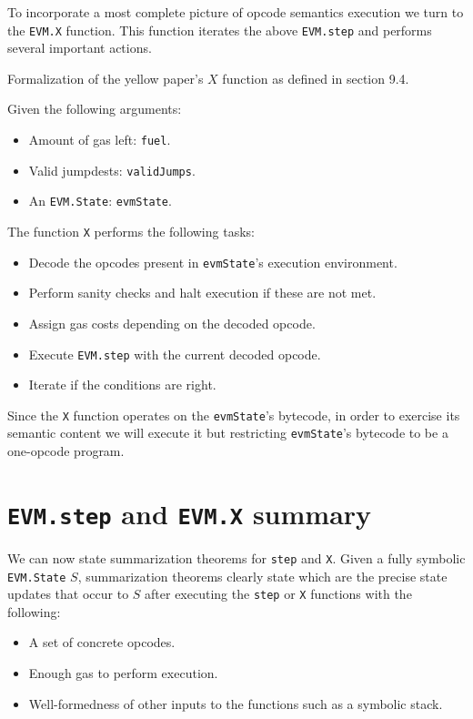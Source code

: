 To incorporate a most complete picture of opcode semantics execution we turn to
the \texttt{EVM.X} function. This function iterates the above \texttt{EVM.step}
and performs several important actions.

\begin{definition}[EVM.X]
\label{def:EVM.X}\leanok{}
Formalization of the yellow paper's $X$ function as defined in section 9.4.

Given the following arguments:
\begin{itemize}
\item Amount of gas left: \texttt{fuel}.
\item Valid jumpdests: \texttt{validJumps}.
\item An \texttt{EVM.State}: \texttt{evmState}.
\end{itemize}

The function \texttt{X} performs the following tasks:
\begin{itemize}
\item Decode the opcodes present in \texttt{evmState}'s execution
environment.
\item Perform sanity checks and halt execution if these are not met.
\item Assign gas costs depending on the decoded opcode.
\item Execute \texttt{EVM.step} with the current decoded opcode.
\item Iterate if the conditions are right.
\end{itemize}
\end{definition}

Since the \texttt{X} function operates on the \texttt{evmState}'s bytecode, in
order to exercise its semantic content we will execute it but restricting
\texttt{evmState}'s bytecode to be a one-opcode program.

\section{\texttt{EVM.step} and \texttt{EVM.X} summary}

We can now state summarization theorems for \texttt{step} and \texttt{X}. Given
a fully symbolic \texttt{EVM.State} $S$, summarization theorems clearly state
which are the precise state updates that occur to $S$ after executing the
\texttt{step} or \texttt{X} functions with the following:

\begin{itemize}
\item A set of concrete opcodes.
\item Enough gas to perform execution.
\item Well-formedness of other inputs to the functions such as a symbolic stack.
\end{itemize}

